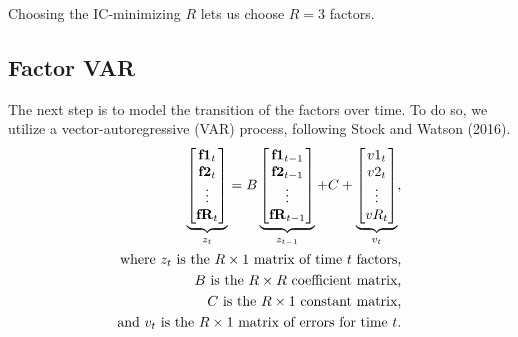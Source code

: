 \documentclass[11pt, letterpaper]{article}\usepackage[]{graphicx}\usepackage[]{color}
\newcommand{\vv}[1]{\textcolor{black}{\mathbf{#1}}}
\begin{document}
Choosing the IC-minimizing $R$ lets us choose $R = 3$ factors.



\subsection{Factor VAR}
The next step is to model the transition of the factors over time. To do so, we utilize a vector-autoregressive (VAR) process, following Stock and Watson (2016).
\begin{align*}
\underbrace{\begin{bmatrix}
	\vv{f1}_{t}\\
	\vv{f2}_{t}\\
	\vdots \\
	\vv{fR}_{t}
\end{bmatrix}}_{z_t}
=
B
\underbrace{\begin{bmatrix}
	\vv{f1}_{t-1}\\
	\vv{f2}_{t-1}\\
	\vdots \\
	\vv{fR}_{t-1}
\end{bmatrix}}_{z_{t-1}}
+
C
+
\underbrace{\begin{bmatrix}
v1_t\\
v2_t\\
\vdots\\
vR_t
\end{bmatrix}}_{v_t},\\
\text{where $z_t$ is the $R \times 1$ matrix of time $t$ factors,}\\
\text{$B$ is the $R \times R$ coefficient matrix,}\\
\text{$C$ is the $R \times 1$ constant matrix,}\\
\text{and $v_t$ is the $R \times 1$ matrix of errors for time $t$.}
\end{align*}
\end{document}
